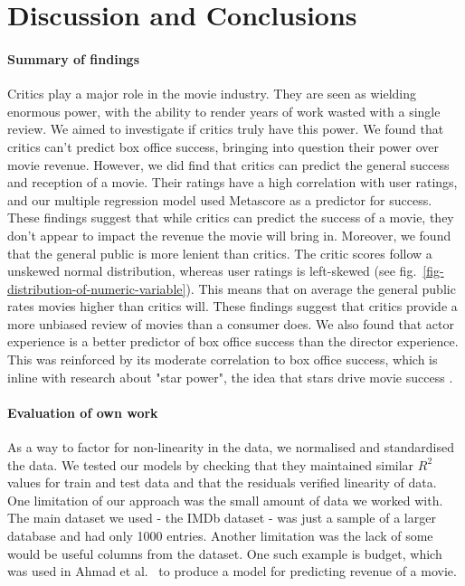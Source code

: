 \section{Discussion and Conclusions}
    \begin{multicols}{2}
        \paragraph{Summary of findings}
            Critics play a major role in the movie industry.
            They are seen as wielding enormous power, with the ability to render years of work wasted with a
                single review.
            We aimed to investigate if critics truly have this power.
            We found that critics can't predict box office success, bringing into question their power over movie
                revenue.
            However, we did find that critics can predict the general success and reception of a movie.
            Their ratings have a high correlation with user ratings, and our multiple regression model used Metascore
                as a predictor for success.
            These findings suggest that while critics can predict the success of a movie, they don't appear to impact
                the revenue the movie will bring in.
            Moreover, we found that the general public is more lenient than critics.
            The critic scores follow a unskewed normal distribution, whereas user ratings is left-skewed (see fig.~\ref{fig-distribution-of-numeric-variable}).
            This means that on average the general public rates movies higher than critics will.
            These findings suggest that critics provide a more unbiased review of movies than a consumer does.
            We also found that actor experience is a better predictor of box office success than the director experience.
            This was reinforced by its moderate correlation to box office success, which is inline with research 
                about "star power", the idea that stars drive movie success \cite{elberse2007power}.

        \paragraph{Evaluation of own work}
            As a way to factor for non-linearity in the data, we normalised
                and standardised the data.
            We tested our models by checking that they maintained similar
                $R^2$ values for train and test data and that the residuals 
                verified linearity of data.
            One limitation of our approach was the small amount of data we worked with.
            The main dataset we used - the IMDb dataset - was just a sample of a larger
                database and had only 1000 entries.
            Another limitation was the lack of some would be useful columns from the dataset.
            One such example is budget, which was used in Ahmad et al.~\cite{ahmadDuraisamyYousefBuckles}
                to produce a model for predicting revenue of a movie.
            

\end{multicols}
